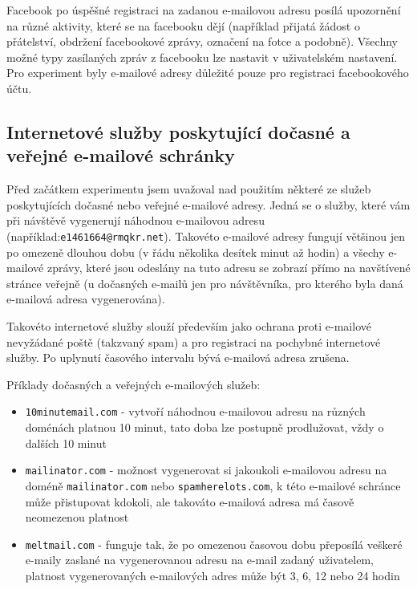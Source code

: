 \documentclass[thesis=M,czech]{FITthesis}[2013/05/10]
\begin{document}
Facebook po úspěšné registraci na zadanou e-mailovou adresu posílá upozornění na různé aktivity, které se na facebooku dějí (například přijatá žádost o přátelství, obdržení facebookové zprávy, označení na fotce a podobně). Všechny možné typy zasílaných zpráv z facebooku lze nastavit v uživatelském nastavení. Pro experiment byly e-mailové adresy důležité pouze pro registraci facebookového účtu.

\subsection{Internetové služby poskytující dočasné a veřejné e-mailové schránky}

Před začátkem experimentu jsem uvažoval nad použitím některé ze služeb poskytujících dočasné nebo veřejné e-mailové adresy. Jedná se o služby, které vám při návštěvě vygenerují náhodnou e-mailovou adresu (například:\newline \verb|e1461664@rmqkr.net|). Takovéto e-mailové adresy fungují většinou jen po omezeně dlouhou dobu (v řádu několika desítek minut až hodin) a všechy e-mailové zprávy, které jsou odeslány na tuto adresu se zobrazí přímo na navštívené stránce veřejně (u dočasných e-mailů jen pro návštěvníka, pro kterého byla daná e-mailová adresa vygenerována).

Takovéto internetové služby slouží především jako ochrana proti e-mailové nevyžádané poště (takzvaný spam) a pro registraci na pochybné internetové služby. Po uplynutí časového intervalu bývá e-mailová adresa zrušena.

Příklady dočasných a veřejných e-mailových služeb:

\begin{itemize}
  \item \verb|10minutemail.com| - vytvoří náhodnou e-mailovou adresu na různých doménách platnou 10 minut, tato doba lze postupně prodlužovat, vždy o dalších 10 minut
  \item \verb|mailinator.com| - možnost vygenerovat si jakoukoli e-mailovou adresu na doméně \verb|mailinator.com| nebo \verb|spamherelots.com|, k této e-mailové schránce může přistupovat kdokoli, ale takováto e-mailová adresa má časově neomezenou platnost
  \item \verb|meltmail.com| - funguje tak, že po omezenou časovou dobu přeposílá veškeré e-maily zaslané na vygenerovanou adresu na e-mail zadaný uživatelem, platnost vygenerovaných e-mailových adres může být 3, 6, 12 nebo 24 hodin
\end{itemize}
\end{document}
